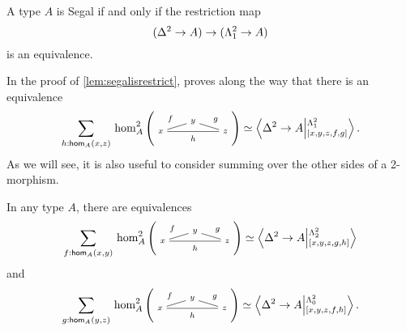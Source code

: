 \documentclass[main.tex]{subfiles}
\begin{document}
\begin{lemma}
    \label{lem:segalisrestrict}
    A type $A$ is Segal if and only if the restriction map
    $$
    (\Delta^2 \to A) \to (\Lambda_1^2 \to A) 
    $$
    is an equivalence. 
    \end{lemma}
    In the proof of \cref{lem:segalisrestrict}, \cite{riehl_type_2017} proves along the way that there is an equivalence
    \begin{equation}
        \sm{h : \ho[A]{x}{z}}\homtwo{A}(x,y,z,f,g,h) \simeq \ndexten{\tsx}{A}{\tohorn}{[x,y,z,f,g]}.
    \end{equation}
    As we will see, it is also useful to consider summing over the other sides of a 2-morphism.
    \begin{proposition}
        In any type $A$, there are equivalences
        \begin{equation}
            \label{rem:sumoverfistt}
        \sm{f : \ho[A]{x}{y}}\homtwo{A}(x,y,z,f,g,h) \simeq \ndexten{\tsx}{A}{\tthorn}{[x,y,z,g,h]}
        \end{equation}
        and
        \begin{equation}
        \sm{g : \ho[A]{y}{z}}\homtwo{A}(x,y,z,f,g,h) \simeq \ndexten{\tsx}{A}{\tzhorn}{[x,y,z,f,h]}.
        \end{equation}
    \end{proposition}
\end{document}
